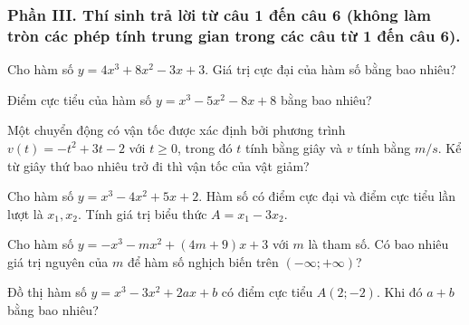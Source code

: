 \subsubsection*{Phần III. Thí sinh trả lời từ câu 1 đến câu 6 (không làm tròn các phép tính trung gian trong các câu từ 1 đến câu 6).}
\setcounter{bt}{0}
\begin{baitap}
	Cho hàm số $y = 4x^3 + 8x^2 - 3x + 3$. Giá trị cực đại của hàm số bằng bao nhiêu?
\end{baitap}

\begin{baitap}
	Điểm cực tiểu của hàm số $y = x^3 - 5x^2 - 8x + 8$ bằng bao nhiêu?
\end{baitap}

\begin{baitap}
	Một chuyển động có vận tốc được xác định bởi phương trình $v(t) = -t^2 + 3t - 2$ với $t \ge 0$, trong đó $t$ tính bằng giây và $v$ tính bằng $\si{m/s}$. Kể từ giây thứ bao nhiêu trở đi thì vận tốc của vật giảm?
\end{baitap}

\begin{baitap}
	Cho hàm số $y = x^3 - 4x^2 + 5x + 2$. Hàm số có điểm cực đại và điểm cực tiểu lần lượt là $x_1, x_2$. Tính giá trị biểu thức $A = x_1 - 3x_2$.
\end{baitap}


\begin{baitap}
	Cho hàm số $y = -x^3 - mx^2 + (4m + 9)x + 3$ với $m$ là tham số. Có bao nhiêu giá trị nguyên của $m$ để hàm số nghịch biến trên $(-\infty; +\infty)$?
\end{baitap}

\begin{baitap}
	Đồ thị hàm số $y = x^3 - 3x^2 + 2ax + b$ có điểm cực tiểu $A(2; -2)$. Khi đó $a + b$ bằng bao nhiêu?
\end{baitap}

